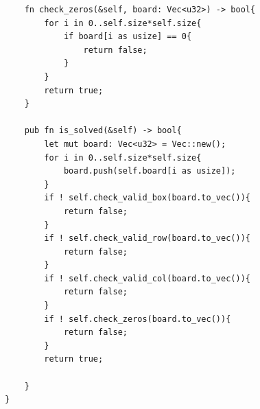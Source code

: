 \documentclass[12pt]{article}
\begin{document}
\begin{verbatim}
    fn check_zeros(&self, board: Vec<u32>) -> bool{
        for i in 0..self.size*self.size{
            if board[i as usize] == 0{
                return false;
            }
        }
        return true;
    }

    pub fn is_solved(&self) -> bool{
        let mut board: Vec<u32> = Vec::new();
        for i in 0..self.size*self.size{
            board.push(self.board[i as usize]);
        }
        if ! self.check_valid_box(board.to_vec()){
            return false;
        }
        if ! self.check_valid_row(board.to_vec()){
            return false;
        }
        if ! self.check_valid_col(board.to_vec()){
            return false;
        }
        if ! self.check_zeros(board.to_vec()){
            return false;
        }
        return true;
        
    }
}
\end{verbatim}
\clearpage
\end{document}
